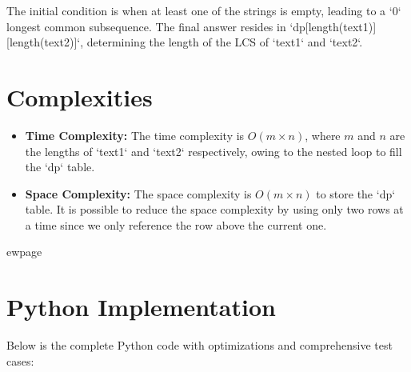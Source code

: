 The initial condition is when at least one of the strings is empty, leading to a `0` longest common subsequence. The final answer resides in `dp[length(text1)][length(text2)]`, determining the length of the LCS of `text1` and `text2`.

\section*{Complexities}
\begin{itemize}
	\item \textbf{Time Complexity:} The time complexity is \(O(m \times n)\), where \(m\) and \(n\) are the lengths of `text1` and `text2` respectively, owing to the nested loop to fill the `dp` table.
	\item \textbf{Space Complexity:} The space complexity is \(O(m \times n)\) to store the `dp` table. It is possible to reduce the space complexity by using only two rows at a time since we only reference the row above the current one.
\end{itemize}


ewpage
\section*{Python Implementation}
Below is the complete Python code with optimizations and comprehensive test cases:

